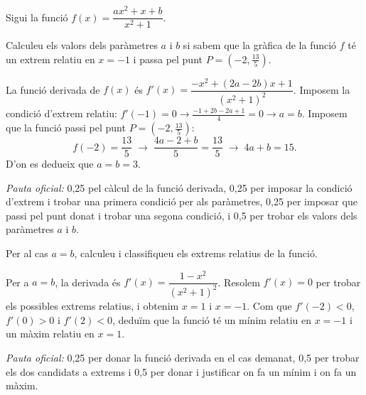 Sigui la funció $f(x)=\dfrac{ax^2+x+b}{x^2+1}$.

\begin{apartats}

Calculeu els valors dels paràmetres $a$ i $b$ si sabem que la gràfica de la funció $f$ té un extrem relatiu en $x=-1$
i passa pel punt $P=\left(-2,\frac{13}{5}\right)$.

\begin{solucio}
La funció derivada de $f(x)$ és $f'(x)=\dfrac{-x^2+(2a-2b)x+1}{\left(x^2+1\right)^2}$. Imposem la condició d'extrem
relatiu: $f'(-1)=0\rightarrow\frac{-1+2b-2a+1}{4}=0\rightarrow a=b$. Imposem que la funció passi pel punt
$P=\left(-2,\frac{13}{5}\right)$:
\[
f(-2)=\frac{13}{5}\;\rightarrow\;\frac{4a-2+b}{5}=\frac{13}{5}\;\rightarrow\;4a+b=15 .
\]
D'on es dedueix que $a=b=3$.

\textit{Pauta oficial:} 0,25 pel càlcul de la funció derivada, 0,25 per imposar la condició d'extrem i trobar una
primera condició per als paràmetres, 0,25 per imposar que passi pel punt donat i trobar una segona condició, i 0,5
per trobar els valors dels paràmetres $a$ i $b$.
\end{solucio}

Per al cas $a=b$, calculeu i classifiqueu els extrems relatius de la funció.

\begin{solucio}
Per a $a=b$, la derivada és $f'(x)=\dfrac{1-x^2}{\left(x^2+1\right)^2}$. Resolem $f'(x)=0$ per trobar els possibles
extrems relatius, i obtenim $x=1$ i $x=-1$. Com que $f'(-2)<0$, $f'(0)>0$ i $f'(2)<0$, deduïm que la funció té un
mínim relatiu en $x=-1$ i un màxim relatiu en $x=1$.

\textit{Pauta oficial:} 0,25 per donar la funció derivada en el cas demanat, 0,5 per trobar els dos candidats a
extrems i 0,5 per donar i justificar on fa un mínim i on fa un màxim.
\end{solucio}

\end{apartats}
